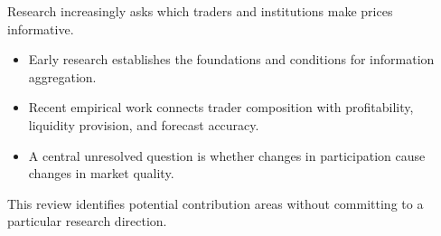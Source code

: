 \begin{frame}[t]
\par{}
\begin{pmbody}
{\color{pmGrey}\fontsize{20}{27}\selectfont Research increasingly asks which traders and institutions make prices informative.\par}
\begin{itemize}\pmspreaditems
  \item Early research establishes the foundations and conditions for information aggregation.
  \item Recent empirical work connects trader composition with profitability, liquidity provision, and forecast accuracy.
  \item A central unresolved question is whether changes in participation cause changes in market quality.
\end{itemize}
\begin{pmcallout}[]
  This review identifies potential contribution areas without committing to a particular research direction.
\end{pmcallout}
\end{pmbody}
\end{frame}
